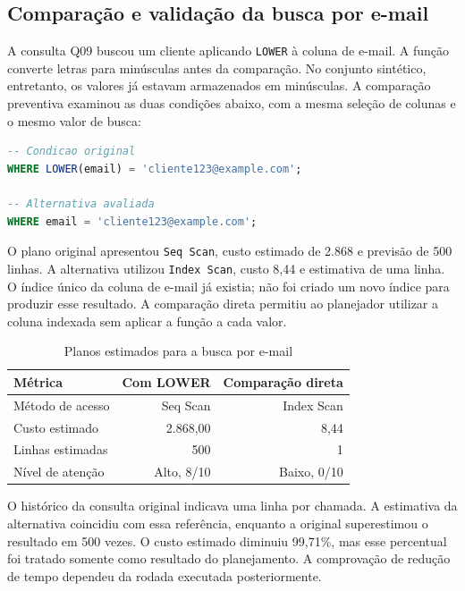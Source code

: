 \documentclass{UNESC}
\newcommand{\fonteautor}{\par\smallskip{\footnotesize Fonte: elaboração própria.}}
\begin{document}
\subsection{Comparação e validação da busca por e-mail}

A consulta Q09 buscou um cliente aplicando \texttt{LOWER} à coluna de e-mail. A função converte letras para minúsculas antes da comparação. No conjunto sintético, entretanto, os valores já estavam armazenados em minúsculas. A comparação preventiva examinou as duas condições abaixo, com a mesma seleção de colunas e o mesmo valor de busca:

\begin{lstlisting}[language=SQL]
-- Condicao original
WHERE LOWER(email) = 'cliente123@example.com';

-- Alternativa avaliada
WHERE email = 'cliente123@example.com';
\end{lstlisting}

O plano original apresentou \texttt{Seq Scan}, custo estimado de 2.868 e previsão de 500 linhas. A alternativa utilizou \texttt{Index Scan}, custo 8,44 e estimativa de uma linha. O índice único da coluna de e-mail já existia; não foi criado um novo índice para produzir esse resultado. A comparação direta permitiu ao planejador utilizar a coluna indexada sem aplicar a função a cada valor.

\begin{table}[H]
\centering
\caption{Planos estimados para a busca por e-mail}
\label{tab:email-planos}
\begin{singlespace}\small
\begin{tabularx}{\linewidth}{Y r r}
\toprule
\textbf{Métrica} & \textbf{Com LOWER} & \textbf{Comparação direta}\\
\midrule
Método de acesso & Seq Scan & Index Scan\\[0.4em]
Custo estimado & 2.868,00 & 8,44\\[0.4em]
Linhas estimadas & 500 & 1\\[0.4em]
Nível de atenção & Alto, 8/10 & Baixo, 0/10\\
\bottomrule
\end{tabularx}
\fonteautor
\end{singlespace}
\end{table}

O histórico da consulta original indicava uma linha por chamada. A estimativa da alternativa coincidiu com essa referência, enquanto a original superestimou o resultado em 500 vezes. O custo estimado diminuiu 99,71\%, mas esse percentual foi tratado somente como resultado do planejamento. A comprovação de redução de tempo dependeu da rodada executada posteriormente.
\end{document}
